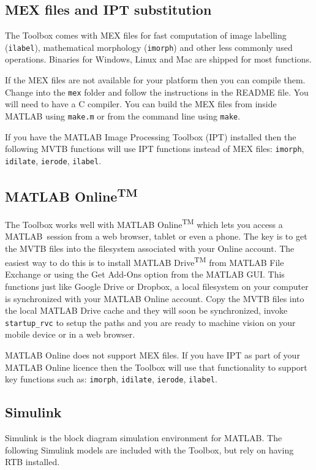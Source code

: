 \documentclass[a4paper,twoside]{report}
\def\Mlab{MATLAB}
\begin{document}
\subsection{MEX files and IPT substitution}
The Toolbox comes with MEX files for fast computation of image labelling (\texttt{ilabel}), mathematical morphology (\texttt{imorph}) and other less commonly used operations.  Binaries for Windows, Linux and Mac are shipped for most functions. 

If the MEX files are not available for your platform then you can compile them. Change into the \texttt{mex} folder and follow the instructions in the README file.  You will need to have a C compiler.  You can build the MEX files from inside MATLAB using \texttt{make.m} or from the command line using \texttt{make}.

If you  have the MATLAB Image Processing Toolbox (IPT) installed then the following MVTB functions will use IPT functions instead of MEX files: \texttt{imorph}, \texttt{idilate}, \texttt{ierode}, \texttt{ilabel}. 

\subsection{MATLAB Online\textsuperscript{TM}}
The Toolbox works well with MATLAB Online\textsuperscript{TM} which lets you access a \Mlab\ session from a web browser, tablet 
or even a phone.
The key is to get the MVTB files into the filesystem associated with your Online account.  The easiest way to do this is to install
MATLAB Drive\textsuperscript{TM} from MATLAB File Exchange or using the Get Add-Ons option from the MATLAB GUI.  This functions
just like Google Drive or Dropbox, a local filesystem on your computer is synchronized with your MATLAB Online account.  Copy the MVTB
files into the local MATLAB Drive cache and they will soon be synchronized, invoke \texttt{startup\_rvc} to setup the paths and you are ready to machine vision on your mobile device or in a web browser.

MATLAB Online does not support MEX files.  If you have IPT as part of your MATLAB Online licence then the Toolbox will use that functionality to support key functions such as: \texttt{imorph}, \texttt{idilate}, \texttt{ierode}, \texttt{ilabel}. 


\subsection{Simulink\textsuperscript{\textregistered}}
Simulink\textsuperscript{\textregistered} is the block diagram simulation environment for MATLAB.
The following Simulink models are included with the Toolbox, but rely on having RTB installed.
\end{document}
